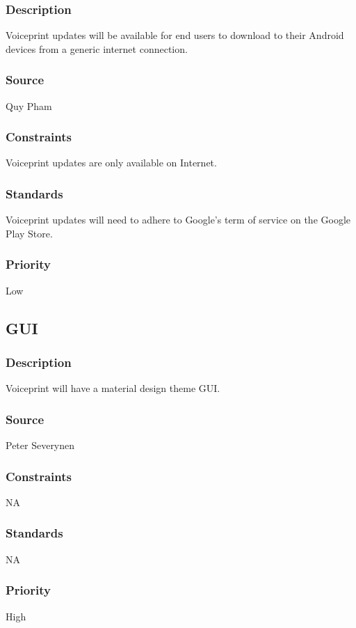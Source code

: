 \subsubsection{Description}
Voiceprint updates will be available for end users to download to their Android devices from a generic internet connection.
\subsubsection{Source}
Quy Pham
\subsubsection{Constraints}
Voiceprint updates are only available on Internet.
\subsubsection{Standards}
Voiceprint updates will need to adhere to Google's term of service on the Google Play Store.
\subsubsection{Priority}
Low

\subsection{GUI}
\subsubsection{Description}
Voiceprint will have a material design theme GUI.
\subsubsection{Source}
Peter Severynen
\subsubsection{Constraints}
NA
\subsubsection{Standards}
NA
\subsubsection{Priority}
High